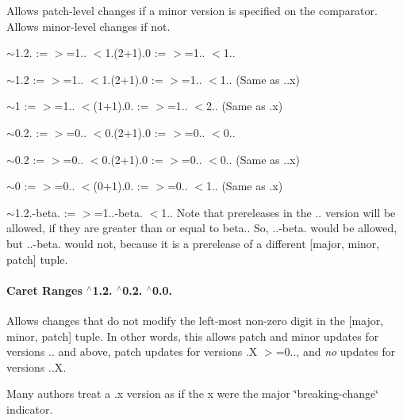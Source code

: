 Allows patch-\/level changes if a minor version is specified on the comparator. Allows minor-\/level changes if not.


\begin{DoxyItemize}
\item {\ttfamily $\sim$1.2.} \+:= {\ttfamily $>$=1.. $<$1.(2+1).0} \+:= {\ttfamily $>$=1.. $<$1..}
\item {\ttfamily $\sim$1.2} \+:= {\ttfamily $>$=1.. $<$1.(2+1).0} \+:= {\ttfamily $>$=1.. $<$1..} (Same as {..\+x})
\item {\ttfamily $\sim$1} \+:= {\ttfamily $>$=1.. $<$(1+1).0.} \+:= {\ttfamily $>$=1.. $<$2..} (Same as {.\+x})
\item {\ttfamily $\sim$0.2.} \+:= {\ttfamily $>$=0.. $<$0.(2+1).0} \+:= {\ttfamily $>$=0.. $<$0..}
\item {\ttfamily $\sim$0.2} \+:= {\ttfamily $>$=0.. $<$0.(2+1).0} \+:= {\ttfamily $>$=0.. $<$0..} (Same as {..\+x})
\item {\ttfamily $\sim$0} \+:= {\ttfamily $>$=0.. $<$(0+1).0.} \+:= {\ttfamily $>$=0.. $<$1..} (Same as {.\+x})
\item {\ttfamily $\sim$1.2.-\/beta.} \+:= {\ttfamily $>$=1..-\/beta. $<$1..} Note that prereleases in the {..} version will be allowed, if they are greater than or equal to {\ttfamily beta.}. So, {..-\/beta.} would be allowed, but {..-\/beta.} would not, because it is a prerelease of a different {\ttfamily \mbox{[}major, minor, patch\mbox{]}} tuple.
\end{DoxyItemize}

\paragraph*{Caret Ranges {\ttfamily $^\wedge$1.2.} {\ttfamily $^\wedge$0.2.} {\ttfamily $^\wedge$0.0.}}

Allows changes that do not modify the left-\/most non-\/zero digit in the {\ttfamily \mbox{[}major, minor, patch\mbox{]}} tuple. In other words, this allows patch and minor updates for versions {..} and above, patch updates for versions {.\+X $>$=0..}, and {\itshape no} updates for versions {..\+X}.

Many authors treat a {.\+x} version as if the {\ttfamily x} were the major \char`\"{}breaking-\/change\char`\"{} indicator.

